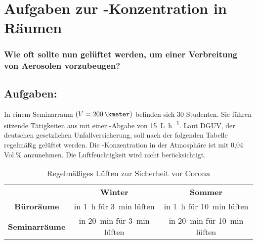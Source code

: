\section{Aufgaben zur -Konzentration in Räumen}
\subsubsection*{Wie oft sollte nun gelüftet werden, um einer Verbreitung von Aerosolen vorzubeugen?}

\subsection*{Aufgaben:}
In einem Seminarraum $(V=\SI{200}{\kmeter})$ befinden sich 30 Studenten. Sie führen sitzende Tätigkeiten aus mit einer -Abgabe von \SI{15}{\liter \per \hour}. Laut DGUV, der deutschen gesetzlichen Unfallversicherung, soll nach der folgenden Tabelle regelmäßig gelüftet werden. Die -Konzentration in der Atmosphäre ist mit 0,04 Vol.\% anzunehmen. Die Luftfeuchtigkeit wird nicht berücksichtigt.

\begin{table}[h!]
	\renewcommand*{\arraystretch}{1.2}
	\centering
	\caption{Regelmäßiges Lüften zur Sicherheit vor Corona \cite{e.V..2020}}
	\label{tab:corona_lueften}
	\begin{tabulary}{1.0\textwidth}{C|C|C}
		\hline
		& \textbf{Winter} &\textbf{Sommer}\\
		\textbf{Büroräume}	& in \SI{1}{\hour} für \SI{3}{\minute} lüften&in \SI{1}{\hour} für \SI{10}{\minute} lüften\\
		\textbf{Seminarräume} & in \SI{20}{\minute} für \SI{3}{\minute} lüften & in \SI{20}{\minute} für \SI{10}{\minute} lüften\\
		\hline			
	\end{tabulary}
\end{table}
\FloatBarrier

